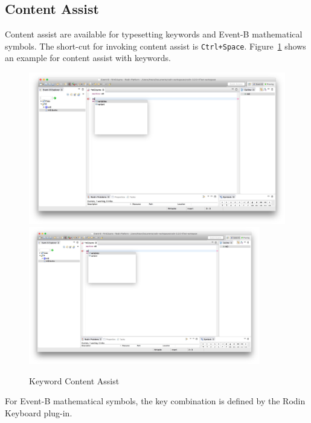 \subsection{Content Assist}
\label{sec:content-assist}
Content assist are available for typesetting keywords and Event-B mathematical symbols. The short-cut for invoking content assist is \texttt{Ctrl+Space}.  Figure~\ref{fig:KeywordContentAssist} shows an example for content assist with keywords.
\begin{figure}[!htbp]
  \centering
  \ifplastex
  \includegraphics[width=512]{figures/KeywordContentAssist}
  \else
  \includegraphics[width=0.9\textwidth]{figures/KeywordContentAssist}
  \fi
  \caption{Keyword Content Assist}
  \label{fig:KeywordContentAssist}
\end{figure}
For Event-B mathematical symbols, the key combination is defined by the Rodin Keyboard plug-in.


